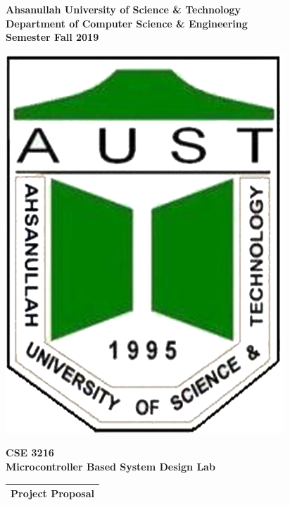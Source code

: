 \begin{titlepage}
    \begin{center}
        \vspace*{1cm}
        \large
        \textbf{Ahsanullah University of Science \& Technology\\
     Department of Computer Science \& Engineering\\Semester Fall 2019}
        \vspace{1cm}
        
        \includegraphics[scale=1]{austLogoTrans.png}
        
        \vspace{.5cm}
        \Large
        \textbf{CSE 3216\\ Microcontroller Based System Design Lab}\\
        \vspace{0.3cm}
        \begin{table}[H]
        \centering
        \label{tab:my-table}
        \begin{tabular}{|l|}
        \hline
        \textbf{\Large{Project Proposal}} \\ \hline
        \end{tabular}
        \end{table}
        

\end{center}
\end{titlepage}
